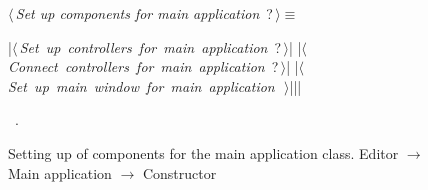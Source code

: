 \documentclass[%
    a4paper,    %
    justified,  %
    nobib,      %
    openany     %
]{tufte-book}
\begin{document}
\begin{figure}
\begin{flushleft} \small
\begin{minipage}{\linewidth}\label{scrap18}\raggedright\small
{} $\langle\,${\itshape Set up components for main application}\nobreak\ {\footnotesize {?}}$\,\rangle\equiv$
\vspace{-1ex}
\begin{pythoncode}
|\hbox{$\langle\,${\itshape Set up controllers for main application}\nobreak\ {\footnotesize ?}$\,\rangle$}|
|\hbox{$\langle\,${\itshape Connect controllers for main application}\nobreak\ {\footnotesize ?}$\,\rangle$}|
|\hbox{$\langle\,${\itshape Set up main window for main application}\nobreak\ {\footnotesize {}}$\,\rangle$}||\NWsep|
\end{pythoncode}
\vspace{1.5ex}
\footnotesize
\begin{list}{}{\setlength{\itemsep}{-\parsep}\setlength{\itemindent}{-\leftmargin}}
\item \NWtxtMacroRefIn\ .

\item{}
\end{list}
\end{minipage}\vspace{4ex}
\end{flushleft}
\caption{Setting up of components for the main application class.
  \newline{}\newline{}Editor $\rightarrow$ Main application $\rightarrow$
  Constructor}
\label{editor:lst:main-application:constructor:methods}
\end{figure}
\end{document}
